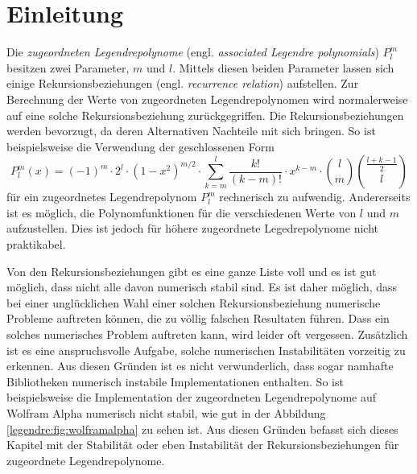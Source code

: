%
%
%
\section{Einleitung\label{legendre:section:einleitung}}
Die {\em zugeordneten Legendrepolynome} (engl. {\em associated Legendre polynomials}) $P^m_l$ besitzen zwei Parameter, $m$ und $l$.
Mittels diesen beiden Parameter lassen sich einige Rekursionsbeziehungen (engl. {\em recurrence relation}) aufstellen.
Zur Berechnung der Werte von zugeordneten Legendrepolynomen wird normalerweise auf eine solche Rekursionsbeziehung zurückgegriffen.
Die Rekursionsbeziehungen werden bevorzugt, da deren Alternativen Nachteile mit sich bringen.
So ist beispielsweise die Verwendung der geschlossenen Form
\begin{equation}
P^{m}_{l}(x)
=
(-1)^m \cdot 2^l \cdot (1-x^2)^{m/2}
\cdot \sum_{k=m}^{l} \frac{k!}{(k-m)!} \cdot x^{k-m}
\cdot \binom{l}{m} \binom{\frac{l+k-1}{2}}{l}
\label{legendre:geschlosseneform}
\end{equation}
für ein zugeordnetes Legendrepolynom $P^m_l$ rechnerisch zu aufwendig.
Andererseits ist es möglich, die Polynomfunktionen für die verschiedenen Werte von $l$ und $m$ aufzustellen.
Dies ist jedoch für höhere zugeordnete Legedrepolynome nicht praktikabel.

Von den Rekursionsbeziehungen gibt es eine ganze Liste voll und es ist gut möglich, dass nicht alle davon numerisch stabil sind.
Es ist daher möglich, dass bei einer unglücklichen Wahl einer solchen Rekursionsbeziehung numerische Probleme auftreten können, die zu völlig falschen Resultaten führen.
Dass ein solches numerisches Problem auftreten kann, wird leider oft vergessen.
Zusätzlich ist es eine anspruchsvolle Aufgabe, solche numerischen Instabilitäten vorzeitig zu erkennen.
Aus diesen Gründen ist es nicht verwunderlich, dass sogar namhafte Bibliotheken numerisch instabile Implementationen enthalten.
So ist beispielsweise die Implementation der zugeordneten Legendrepolynome auf Wolfram Alpha \cite{legendre:wolfram-alpha} numerisch nicht stabil, wie gut in der Abbildung \ref{legendre:fig:wolframalpha} zu sehen ist.
Aus diesen Gründen befasst sich dieses Kapitel mit der Stabilität oder eben Instabilität der Rekursionsbeziehungen für zugeordnete Legendrepolynome.

